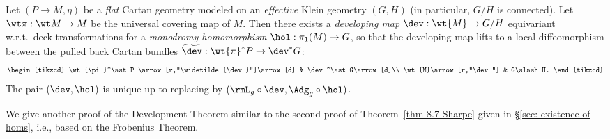 \begin{thm}\label{thm development flat cartan}
    Let $(P\to M,\eta)$ be a \emph{flat} Cartan geometry modeled on an \emph{effective} Klein geometry $(G,H)$ (in particular, $G\slash H$ is connected). Let $\wt\pi:\wt M\to M$ be the universal covering map of $M$. Then there exists a \emph{developing map} $\dev:\wt{M}\to G\slash H$ equivariant w.r.t.\ deck transformations for a \emph{monodromy homomorphism} $\hol:\pi_1(M)\to G$, so that the developing map lifts to a local diffeomorphism between the pulled back Cartan bundles $\widetilde{\dev}:\wt{\pi}^\ast P\to \dev^\ast G$:
    \[
    \begin{tikzcd}
        \wt{\pi}^\ast P \arrow[r,"\widetilde{\dev}"]\arrow[d] & \dev^\ast G\arrow[d]\\
        \wt{M}\arrow[r,"\dev"] & G\slash H.
    \end{tikzcd}
    \]
    The pair $(\dev,\hol)$ is unique up to replacing by $(\rmL_g\circ \dev,\Adg_g\circ \hol)$.
\end{thm}
We give another proof of the Development Theorem similar to the second proof of Theorem~\ref{thm 8.7 Sharpe} given in \S\ref{sec: existence of homs}, i.e., based on the Frobenius Theorem.
